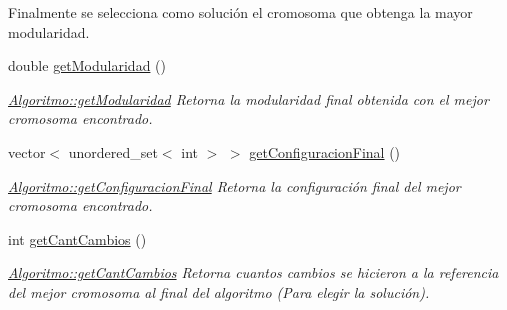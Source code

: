 \begin{DoxyCompactItemize}
\begin{DoxyCompactList}
 Finalmente se selecciona como soluci\'{o}n el cromosoma que obtenga la mayor modularidad. \end{DoxyCompactList}\item 
double \hyperlink{class_algoritmo_ab547948993b374fb0721c1f7ec46ded8}{get\-Modularidad} ()
\begin{DoxyCompactList}\small\item\em \hyperlink{class_algoritmo_ab547948993b374fb0721c1f7ec46ded8}{Algoritmo\-::get\-Modularidad} Retorna la modularidad final obtenida con el mejor cromosoma encontrado. \end{DoxyCompactList}\item 
vector$<$ unordered\-\_\-set$<$ int $>$ $>$ \hyperlink{class_algoritmo_a02ba46efa94c279b129c92365a6a369c}{get\-Configuracion\-Final} ()
\begin{DoxyCompactList}\small\item\em \hyperlink{class_algoritmo_a02ba46efa94c279b129c92365a6a369c}{Algoritmo\-::get\-Configuracion\-Final} Retorna la configuraci\'{o}n final del mejor cromosoma encontrado. \end{DoxyCompactList}\item 
int \hyperlink{class_algoritmo_a58bbe61d845ba28704b4b44e74f89b6c}{get\-Cant\-Cambios} ()
\begin{DoxyCompactList}\small\item\em \hyperlink{class_algoritmo_a58bbe61d845ba28704b4b44e74f89b6c}{Algoritmo\-::get\-Cant\-Cambios} Retorna cuantos cambios se hicieron a la referencia del mejor cromosoma al final del algoritmo (Para elegir la soluci\'{o}n). \end{DoxyCompactList}\end{DoxyCompactItemize}
